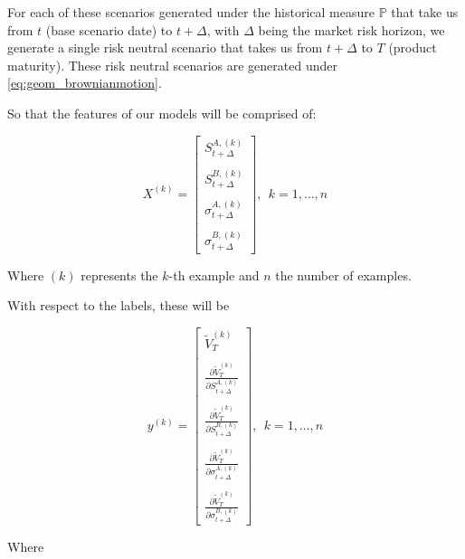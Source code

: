 For each of these scenarios generated under the historical measure $\mathbb{P}$ that take us from $t$ (base scenario date) to $t+\Delta$, with $\Delta$ being the market risk horizon, we generate a single risk neutral scenario that takes us from $t+\Delta$ to $T$ (product maturity). These risk neutral scenarios are generated under \ref{eq:geom_brownianmotion}. 

So that the features of our models will be comprised of:

$$
X^{(k)}=\left[\begin{array}{c}
S_{t+\Delta}^{A,(k)} \\ \\
S_{t+\Delta}^{B,(k)} \\ \\
\sigma_{t+\Delta}^{A,(k)} \\ \\
\sigma_{t+\Delta}^{B,(k)}
\end{array}\right], \ \  k=1, \ldots, n
$$

Where $(k)$ represents the $k$-th example and $n$ the number of examples.

With respect to the labels, these will be 

$$
y^{(k)}=\left[\begin{array}{l}
\tilde{V}_{T}^{(k)} \\ \\
\frac{\partial \tilde{V}_{T}^{(k)}}{\partial S_{t+\Delta}^{A,(k)}} \\ \\
\frac{\partial \tilde{V}_{T}^{(k)}}{\partial S_{t+\Delta}^{B,(k)}} \\ \\
\frac{\partial \tilde{V}_{T}^{(k)}}{\partial \sigma_{t+\Delta}^{A,(k)}} \\ \\
\frac{\partial \tilde{V}_{T}^{(k)}}{\partial \sigma_{t+\Delta}^{B,(k)}}
\end{array}\right],\ \ k=1, \ldots, n
$$

Where

